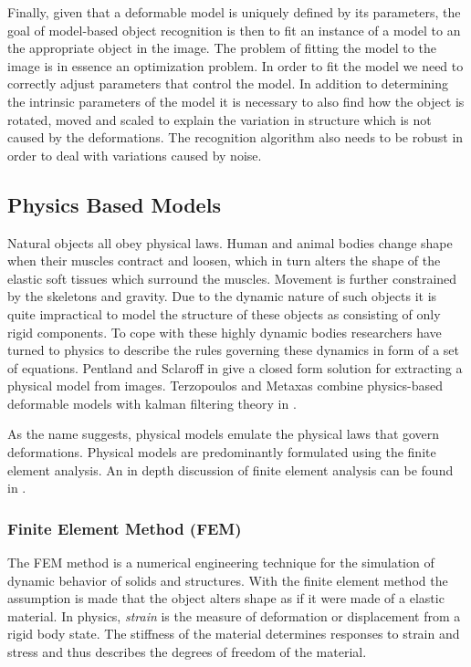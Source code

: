 \documentclass[11pt,a4paper]{report}
\begin{document}
Finally, given that a deformable model is uniquely defined by its parameters,
 the goal of model-based object recognition is then to fit an instance of a model to
an the appropriate object in the image. The problem of fitting the model to the
image is in essence an optimization problem. In order to fit the model we need to
correctly adjust parameters that control the model. In addition to determining
the intrinsic parameters of the model it is necessary to also find how the
object is rotated, moved and scaled to explain the variation in structure which
is not caused by the deformations. The recognition algorithm also needs to be
robust in order to deal with variations caused by noise.

\subsection{Physics Based Models}
Natural objects all obey physical laws. Human and animal bodies change shape
when their muscles contract and loosen, which in turn alters the shape of the
elastic soft tissues which surround the muscles. Movement is further constrained
by the skeletons and gravity. Due to the dynamic nature of such objects it is quite impractical to
model the structure of these objects as consisting of only rigid components. To cope with
these highly dynamic bodies researchers have turned to physics to describe the
rules governing these dynamics in form of a set of equations. Pentland and
Sclaroff in  \cite{FEM1pen} give a closed form solution for extracting a
physical model from images. Terzopoulos and Metaxas combine physics-based
deformable models with kalman filtering theory in \cite{FEM1ter}.  

As the name suggests, physical models emulate the physical laws that govern
deformations. Physical models are predominantly formulated using the finite
element analysis. An in depth discussion of finite element
analysis can be found in \cite{FEMbook}.

\subsubsection{Finite Element Method (FEM)}
The FEM method is a numerical engineering technique for the simulation of dynamic
behavior of solids and structures. With the finite element method the assumption is made that
the object alters shape as if it were made of a elastic material. In physics,
\textit{strain} is the measure of deformation or displacement from a rigid body state. The stiffness
of the material determines responses to strain and stress and thus describes the
degrees of freedom of the material.
\end{document}
